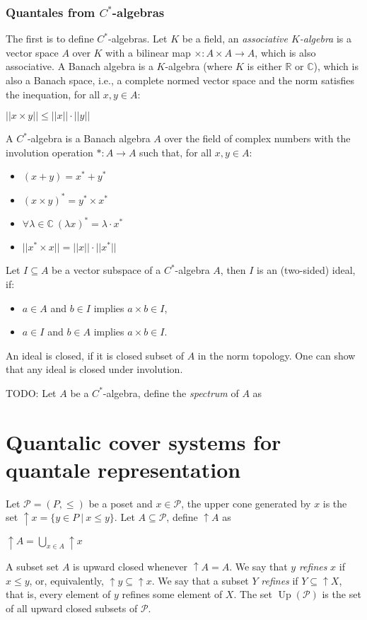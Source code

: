 \documentclass[a4paper]{article}
\theoremstyle{defin}
\theoremstyle{theorem}
\theoremstyle{claim}
\theoremstyle{prop}
\theoremstyle{lemma}
\theoremstyle{fact}
\theoremstyle{ex}
\theoremstyle{col}
\begin{document}
\subsubsection{Quantales from $C^{*}$-algebras}

The first is to define $C^{*}$-algebras. Let $K$ be a field, an \emph{associative $K$-algebra} is a vector space $A$ over $K$ with a bilinear map $\times : A \times A \to A$, which is also associative. A Banach algebra is a $K$-algebra (where $K$ is either $\mathbb{R}$ or $\mathbb{C}$), which is also a Banach space, i.e., a complete normed vector space and the norm satisfies the inequation, for all $x, y \in A$:
\begin{center}
$||x \times y|| \leq ||x|| \cdot ||y||$
\end{center}

A $C^{*}$-algebra is a Banach algebra $A$ over the field of complex numbers with the involution operation $* : A \to A$ such that, for all $x, y \in A$:
\begin{itemize}
\item $(x + y) = x^* + y^*$
\item $(x \times y)^* = y^* \times x^*$
\item $\forall \lambda \in \mathbb{C} \: (\lambda x)^* = \lambda \cdot x^*$
\item $||x^* \times x|| = ||x||\cdot||x^*||$
\end{itemize}

Let $I \subseteq A$ be a vector subspace of a $C^*$-algebra $A$, then $I$ is an (two-sided) ideal, if:
\begin{itemize}
\item $a \in A$ and $b \in I$ implies $a \times b \in I$,
\item $a \in I$ and $b \in A$ implies $a \times b \in I$.
\end{itemize}
An ideal is closed, if it is closed subset of $A$ in the norm topology. One can show that any ideal is closed under involution.

TODO: Let $A$ be a $C^*$-algebra, define the \emph{spectrum} of $A$ as

\section{Quantalic cover systems for quantale representation}

Let $\mathcal{P} = (P, \leq)$ be a poset and $x \in \mathcal{P}$, the upper cone generated by $x$ is the set $\uparrow x = \{ y \in P \: | \: x \leq y \}$. Let $A \subseteq \mathcal{P}$, define $\uparrow A$ as
\begin{center}
$\uparrow A = \bigcup \limits_{x \in A} \uparrow x$
\end{center}
A subset set $A$ is upward closed whenever $\uparrow A = A$.
We say that $y$ \emph{refines} $x$ if $x \leq y$, or, equivalently, $\uparrow y \subseteq \uparrow x$. We say that a subset $Y$ \emph{refines} if $Y \subseteq \uparrow X$, that is, every element of $y$ refines some element of $X$. The set $\operatorname{Up}(\mathcal{P})$ is the set of all upward closed subsets of $\mathcal{P}$.
\end{document}
